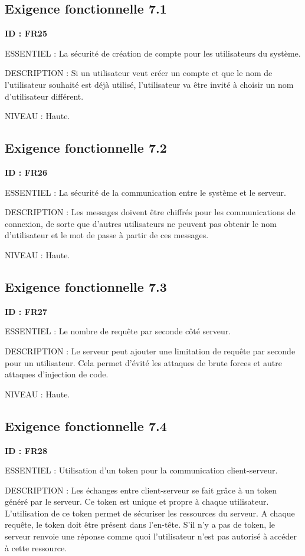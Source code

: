 \documentclass[titlepage, 12pt]{report}
\begin{document}
\subsection{Exigence fonctionnelle 7.1}

\textbf{ID : FR25}

ESSENTIEL : La sécurité de création de compte pour les utilisateurs du système.

DESCRIPTION : Si un utilisateur veut créer un compte et que le nom de l'utilisateur souhaité est déjà utilisé, l'utilisateur va être invité à choisir un nom d'utilisateur différent.

NIVEAU : Haute.

\subsection{Exigence fonctionnelle 7.2}

\textbf{ID : FR26}

ESSENTIEL : La sécurité de la communication entre le système et le serveur.

DESCRIPTION : Les messages doivent être chiffrés pour les communications de connexion, de sorte que d'autres utilisateurs ne peuvent pas obtenir le nom d'utilisateur et le mot de passe à partir de ces messages.

NIVEAU : Haute.

\subsection{Exigence fonctionnelle 7.3}

\textbf{ID : FR27}

ESSENTIEL : Le nombre de requête par seconde côté serveur.

DESCRIPTION : Le serveur peut ajouter une limitation de requête par seconde pour un utilisateur. Cela permet d'évité les attaques de brute forces et autre attaques d'injection de code.

NIVEAU : Haute.

\subsection{Exigence fonctionnelle 7.4}

\textbf{ID : FR28}

ESSENTIEL : Utilisation d’un token pour la communication client-serveur.

DESCRIPTION : Les échanges entre client-serveur se fait grâce à un token généré par le serveur. Ce token est unique et propre à chaque utilisateur. L'utilisation de ce token permet de sécuriser les ressources du serveur. A chaque requête, le token doit être présent dans l'en-tête. S'il n'y a pas de token, le serveur renvoie une réponse comme quoi l'utilisateur n'est pas autorisé à accéder à cette ressource.
\end{document}
